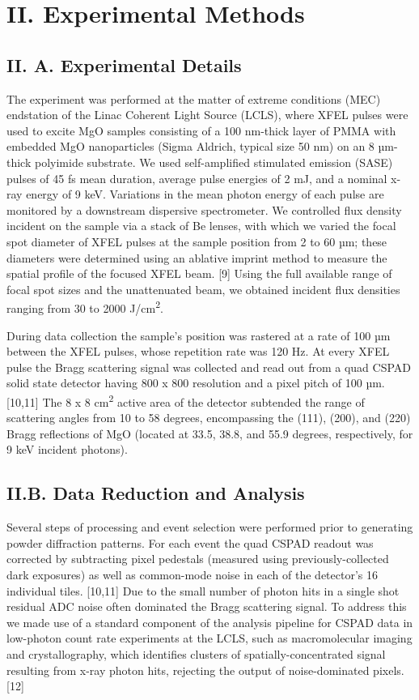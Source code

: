 \section{II. Experimental Methods}

\subsection{II. A. Experimental Details}

The experiment was performed at the matter of extreme conditions (MEC)
endstation of the Linac Coherent Light Source (LCLS), where XFEL pulses
were used to excite MgO samples consisting of a 100 nm-thick layer of
PMMA with embedded MgO nanoparticles (Sigma Aldrich, typical size 50 nm)
on an 8 µm-thick polyimide substrate. We used self-amplified stimulated
emission (SASE) pulses of 45 fs mean duration, average pulse energies of
2 mJ, and a nominal x-ray energy of 9 keV. Variations in the mean photon
energy of each pulse are monitored by a downstream dispersive
spectrometer. We controlled flux density incident on the sample via a
stack of Be lenses, with which we varied the focal spot diameter of XFEL
pulses at the sample position from 2 to 60 µm; these diameters were
determined using an ablative imprint method to measure the spatial
profile of the focused XFEL beam. {[}9{]} Using the full available range
of focal spot sizes and the unattenuated beam, we obtained incident flux
densities ranging from 30 to 2000 J/cm\textsuperscript{2}.

During data collection the sample's position was rastered at a rate of
100 µm between the XFEL pulses, whose repetition rate was 120 Hz. At
every XFEL pulse the Bragg scattering signal was collected and read out
from a quad CSPAD solid state detector having 800 x 800 resolution and a
pixel pitch of 100 µm. {[}10,11{]} The 8 x 8 cm\textsuperscript{2}
active area of the detector subtended the range of scattering angles
from 10 to 58 degrees, encompassing the (111), (200), and (220) Bragg
reflections of MgO (located at 33.5, 38.8, and 55.9 degrees,
respectively, for 9 keV incident photons).

\subsection{II.B. Data Reduction and Analysis}

Several steps of processing and event selection were performed prior to
generating powder diffraction patterns. For each event the quad CSPAD
readout was corrected by subtracting pixel pedestals (measured using
previously-collected dark exposures) as well as common-mode noise in
each of the detector's 16 individual tiles. {[}10,11{]} Due to the small
number of photon hits in a single shot residual ADC noise often
dominated the Bragg scattering signal. To address this we made use of a
standard component of the analysis pipeline for CSPAD data in low-photon
count rate experiments at the LCLS, such as macromolecular imaging and
crystallography, which identifies clusters of spatially-concentrated
signal resulting from x-ray photon hits, rejecting the output of
noise-dominated pixels. {[}12{]}

